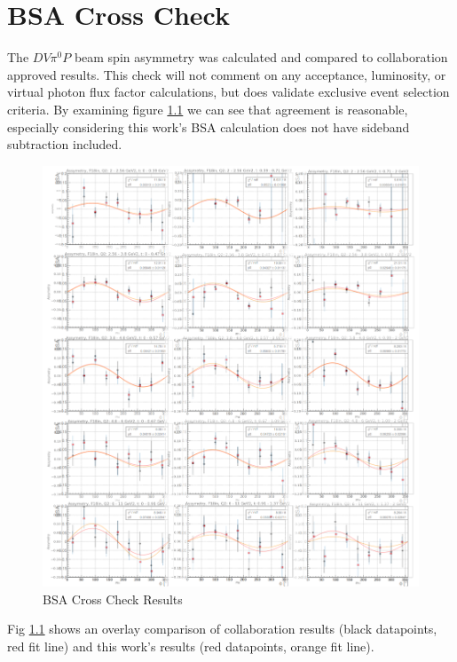 \chapter{BSA Cross Check}


The $DV\pi^0P$ beam spin asymmetry was calculated and compared to collaboration approved results. This check will not comment on any acceptance, luminosity, or virtual photon flux factor calculations, but does validate exclusive event selection criteria. By examining figure \ref{fig:bsa} we can see that agreement is reasonable, especially considering this work's BSA calculation does not have sideband subtraction included.

\begin{figure}[hbt]
	\centering
	\includegraphics[width=0.75\linewidth]{Chapters/Postamble/appendices/app_b/pics/BSA.png}
	\caption{BSA Cross Check Results}
	\label{fig:bsa}
\end{figure}

Fig \ref{fig:bsa} shows an overlay comparison of collaboration results (black datapoints, red fit line) and this work's results (red datapoints, orange fit line).
